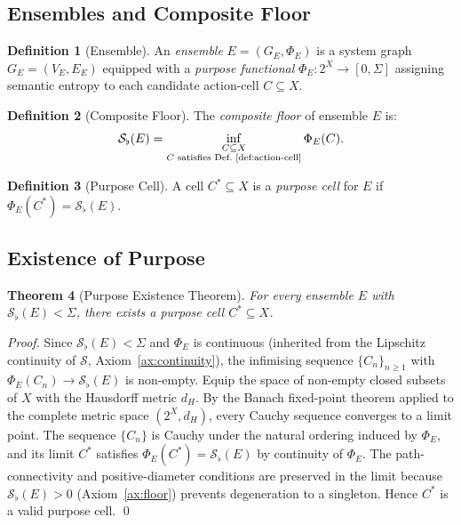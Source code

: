 \documentclass[twocolumn,a4paper,11pt]{article}
\theoremstyle{plain}
\newtheorem{theorem}{Theorem}[section]
\theoremstyle{definition}
\newtheorem{definition}[theorem]{Definition}
\theoremstyle{remark}
\newcommand{\Sflat}{\mathcal{S}_{\flat}}
\begin{document}
\subsection{Ensembles and Composite Floor}

\begin{definition}[Ensemble]
\label{def:ensemble}
An \emph{ensemble} $E = (G_E, \Phi_E)$ is a system graph $G_E = (V_E, E_E)$
equipped with a \emph{purpose functional}
$\Phi_E: 2^X \to [0, \Sigma]$ assigning semantic entropy to each
candidate action-cell $C \subseteq X$.
\end{definition}

\begin{definition}[Composite Floor]
\label{def:composite-floor}
The \emph{composite floor} of ensemble $E$ is:
\[
  \Sflat(E) = \inf_{\substack{C \subseteq X \\ C \text{ satisfies
  Def.~\ref{def:action-cell}}}} \Phi_E(C).
\]
\end{definition}

\begin{definition}[Purpose Cell]
\label{def:purpose-cell}
A cell $C^* \subseteq X$ is a \emph{purpose cell} for $E$ if
$\Phi_E(C^*) = \Sflat(E)$.
\end{definition}

\subsection{Existence of Purpose}

\begin{theorem}[Purpose Existence Theorem]
\label{thm:purpose-existence}
For every ensemble $E$ with $\Sflat(E) < \Sigma$, there exists a purpose
cell $C^* \subseteq X$.
\end{theorem}

\begin{proof}
Since $\Sflat(E) < \Sigma$ and $\Phi_E$ is continuous (inherited from
the Lipschitz continuity of $\mathcal{S}$, Axiom~\ref{ax:continuity}),
the infimising sequence $\{C_n\}_{n \geq 1}$ with
$\Phi_E(C_n) \to \Sflat(E)$ is non-empty. Equip the space of non-empty
closed subsets of $X$ with the Hausdorff metric $d_H$. By the Banach
fixed-point theorem \cite{banach1922} applied to the complete metric
space $(2^X, d_H)$, every Cauchy sequence converges to a limit point.
The sequence $\{C_n\}$ is Cauchy under the natural ordering induced by
$\Phi_E$, and its limit $C^*$ satisfies $\Phi_E(C^*) = \Sflat(E)$ by
continuity of $\Phi_E$. The path-connectivity and positive-diameter
conditions are preserved in the limit because $\Sflat(E) > 0$
(Axiom~\ref{ax:floor}) prevents degeneration to a singleton. Hence $C^*$
is a valid purpose cell. \qed
\end{proof}
\end{document}
